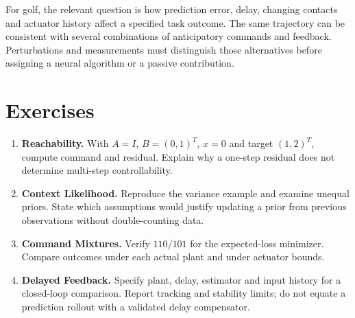 For golf, the relevant question is how prediction error, delay, changing
contacts and actuator history affect a specified task outcome. The same
trajectory can be consistent with several combinations of anticipatory
commands and feedback. Perturbations and measurements must distinguish those
alternatives before assigning a neural algorithm or a passive contribution.

\section*{Exercises}
\begin{enumerate}
 \item \textbf{Reachability.} With $A=I$, $B=(0,1)^T$, $x=0$ and target
 $(1,2)^T$, compute command and residual. Explain why a one-step residual
 does not determine multi-step controllability.
 \item \textbf{Context Likelihood.} Reproduce the variance example and
 examine unequal priors. State which assumptions would justify updating a
 prior from previous observations without double-counting data.
 \item \textbf{Command Mixtures.} Verify $110/101$ for the expected-loss
 minimizer. Compare outcomes under each actual plant and under actuator bounds.
 \item \textbf{Delayed Feedback.} Specify plant, delay, estimator and input
 history for a closed-loop comparison. Report tracking and stability limits;
 do not equate a prediction rollout with a validated delay compensator.
\end{enumerate}
